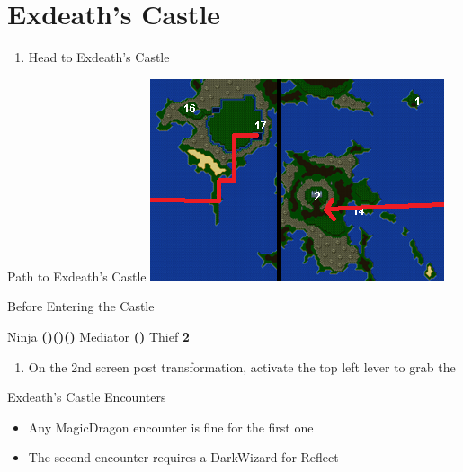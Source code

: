 \chapter{Exdeath's Castle}

\vspace{\baselineskip}

\begin{paracol}{2}

\begin{enumerate}
    \item Head to Exdeath's Castle
\end{enumerate}

\switchcolumn
\begin{misc}{Path to Exdeath's Castle}
    \includegraphics[scale=0.7]{../Graphics/Maps/12. To Exdeath's Castle.png}
\end{misc}

\switchcolumn
\begin{menu}{Before Entering the Castle}
    \varwb
    \begin{jobMenu}
        \cara Ninja \textbf{(\pointLeft)(\pointDown)(\pointLeft)} \ability{!\escape}
        \faris Mediator \textbf{(\pointUp)}       
        \lenna Thief \textbf{2\pointRight}
    \end{jobMenu}
    \varwe
\end{menu}

\begin{enumerate}[resume]
    \item On the 2nd screen post transformation, activate the top left lever to grab the 
\end{enumerate}

\switchcolumn*
\begin{steproute}{Exdeath's Castle Encounters}
    \begin{itemize}
        \item Any MagicDragon encounter is fine for the first one
        \item The second encounter requires a DarkWizard for Reflect
    \end{itemize}
\end{steproute}


\end{paracol}
